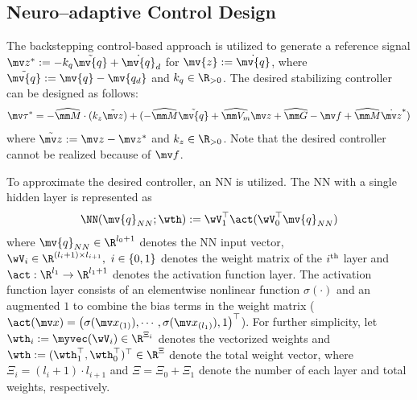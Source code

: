 \documentclass[letterpaper, 10 pt, conference]{ieeeconf}  %
\newcommand*{\q}{\mv{q}}
\newcommand*{\dq}{\dot{\q}}
\newcommand*{\qd}{\mv{q_d}}
\begin{document}
\subsection{Neuro–adaptive Control Design} \label{sec:ctrl dev}

The backstepping control-based approach is utilized to generate a reference signal $\mv z^*:= -{k_q}\tilde {\q}+\dq_d$ for $\mv {z}:= \dq$, where $\tilde {\q}:= \mv {q} - \qd$ and $k_q\in\R_{>0}$.
The desired stabilizing controller can be designed as follows:
\begin{equation}
    \mv \tau^* = 
    -\widehat{\mm M}\cdot ({k_z}\tilde {\mv z})
    + 
        ( 
            -\widehat{\mm M}\tilde {\q}
            +
            \widehat{\mm V_m}{\mv z}
            +
            \widehat{\mm G}
            -
            \mv f
            +
            \widehat{\mm M} \dot {\mv z}^*
        )
    \label{eq. desired control}
\end{equation}
where $\tilde {\mv z}:= \mv z-\mv z^*$ and $k_z\in\R_{>0}$.
Note that the desired controller cannot be realized because of $\mv f$.

To approximate the desired controller, an NN is utilized.
The NN with a single hidden layer is represented as 
\begin{equation}
    \NN({\q_{NN}};\wth):= \wV_1^\top \act(\wV_0^\top {\q_{NN}})
\end{equation}
where ${\q_{NN}}\in\R^{l_0+1}$ denotes the NN input vector, $\wV_i\in\R^{(l_i+1)\times l_{i+1}},\ i\in\{0,1\}$ denotes the weight matrix of the $i\textsuperscript{th}$ layer and $\act:\R^{l_1}\to\R^{l_1+1}$ denotes the activation function layer.
The activation function layer consists of an elementwise nonlinear function $\sigma(\cdot)$ and an augmented $1$ to combine the bias terms in the weight matrix (\ie $\act(\mv x) = \left(\sigma(\mv x_{(1)}),\cdots, \sigma(\mv x_{(l_1)}), 1\right)^\top $).
For further simplicity, let $\wth_i:= \myvec(\wV_i)\in\R^{\Xi_i}$ denotes the vectorized weights and $\wth:=(\wth_1^\top ,\wth_0^\top )^\top \in\R^{\Xi}$ denote the total weight vector, where $\Xi_i=(l_i+1)\cdot l_{i+1}$ and $\Xi=\Xi_0+\Xi_1$ denote the number of each layer and total weights, respectively.
\end{document}

